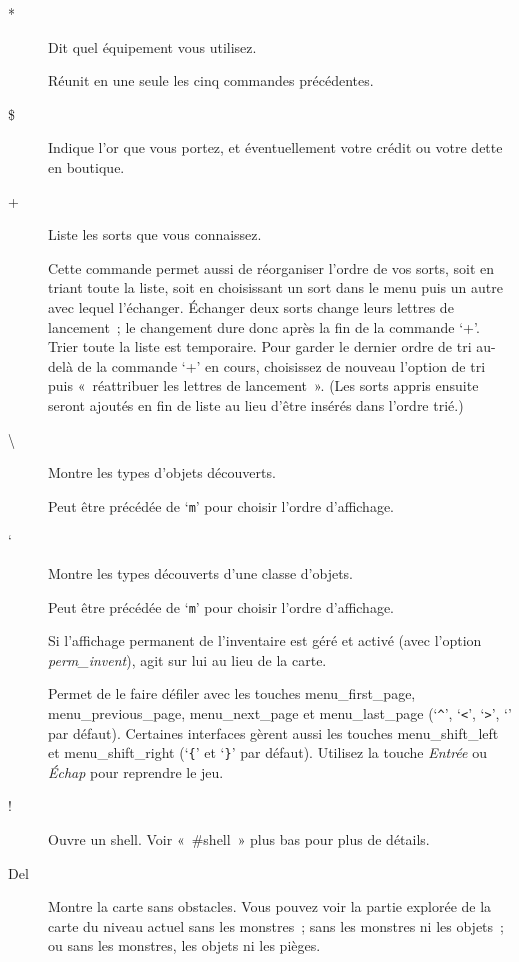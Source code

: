 \documentclass[titlepage]{article}
\begin{document}
\begin{description}
\item[{*}]
Dit quel équipement vous utilisez.


Réunit en une seule les cinq commandes précédentes.

\item[{\$}]
Indique l'or que vous portez, et éventuellement votre crédit ou votre
dette en boutique.

\item[{+}]
Liste les sorts que vous connaissez.


Cette commande permet aussi de réorganiser l'ordre de vos sorts, soit en
triant toute la liste, soit en choisissant un sort dans le menu puis un
autre avec lequel l'échanger.
Échanger deux sorts change leurs lettres de lancement~; le changement
dure donc après la fin de la commande `+'.
Trier toute la liste est temporaire.
Pour garder le dernier ordre de tri au-delà de la commande `+' en
cours, choisissez de nouveau l'option de tri puis «~réattribuer les
lettres de lancement~».
(Les sorts appris ensuite seront ajoutés en fin de liste au lieu d'être
insérés dans l'ordre trié.)

\item[{\textbackslash{}}]
Montre les types d'objets découverts.


Peut être précédée de `\texttt{m}' pour choisir l'ordre d'affichage.

\item[{`}]
Montre les types découverts d'une classe d'objets.


Peut être précédée de `\texttt{m}' pour choisir l'ordre d'affichage.

\item[{\textbar{}}]
Si l'affichage permanent de l'inventaire est géré et activé (avec l'option
\textit{perm\_invent}),
agit sur lui au lieu de la carte.


Permet de le faire défiler avec les touches
menu\_first\_page, menu\_previous\_page,
menu\_next\_page et menu\_last\_page
(`\texttt{\textasciicircum{}}', `\texttt{\textless{}}', `\texttt{\textgreater{}}', `\texttt{\textbar{}}'
par défaut).
Certaines interfaces gèrent aussi les touches menu\_shift\_left et
menu\_shift\_right (`\texttt{\{}' et `\texttt{\}}' par défaut).
Utilisez la touche \textit{Entrée} ou \textit{Échap} pour reprendre le jeu.

\item[{!}]
Ouvre un shell.
Voir «~\#shell~» plus bas pour plus de détails.

\item[{Del}]
Montre la carte sans obstacles.
Vous pouvez voir la partie explorée de la carte du niveau actuel sans les
monstres~; sans les monstres ni les objets~; ou sans les monstres, les
objets ni les pièges.



\end{description}
\end{document}
